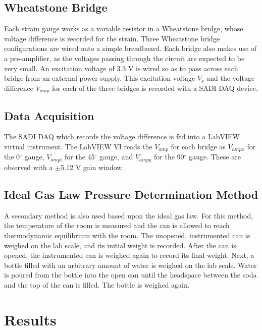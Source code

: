 \documentclass[10pt,journal,letterpaper]{IEEEtran}
\begin{document}
\subsection{Wheatstone Bridge}

Each strain gauge works as a variable resistor in a Wheatstone bridge, whose voltage difference is recorded for the strain.
Three Wheatstone bridge configurations are wired onto a simple breadboard.
Each bridge also makes use of a pre-amplifier, as the voltages passing through the circuit are expected to be very small.
An excitation voltage of 3.3 V is wired so as to pass across each bridge from an external power supply.
This excitation voltage $V_s$ and the voltage difference $V_{amp}$ for each of the three bridges is recorded with a SADI DAQ device.

\subsection{Data Acquisition}

The SADI DAQ which records the voltage difference is fed into a LabVIEW virtual instrument.
The LabVIEW VI reads the $V_{amp}$ for each bridge as $V_{ampx}$ for the 0$^\circ$ gauge, $V_{ampt}$  for the 45$^\circ$ gauge, and $V_{ampy}$ for the 90$^\circ$ gauge.
These are observed with a $\pm$5.12 V gain window.

\subsection{Ideal Gas Law Pressure Determination Method}

A secondary method is also used based upon the ideal gas law.
For this method, the temperature of the room is measured and the can is allowed to reach thermodynamic equilibrium with the room.
The unopened, instrumented can is weighed on the lab scale, and its initial weight is recorded.
After the can is opened, the instrumented can is weighed again to record its final weight.
Next, a bottle filled with an arbitrary amount of water is weighed on the lab scale.
Water is poured from the bottle into the open can until the headspace between the soda and the top of the can is filled.
The bottle is weighed again.

\section{Results}

\lipsum[9-10]
\end{document}
